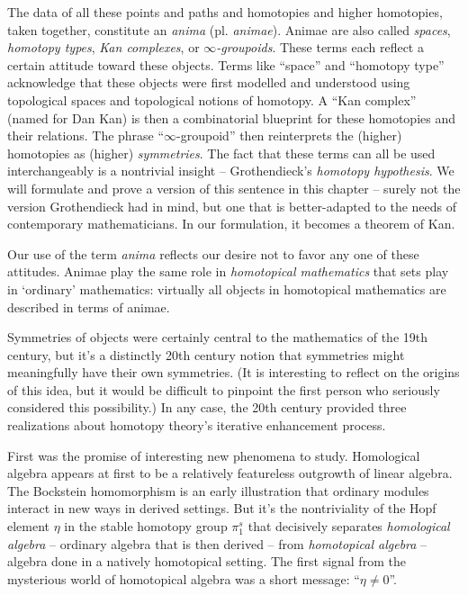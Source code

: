 The data of all these points and paths and homotopies and higher homotopies, taken together, constitute an \emph{anima} (pl. \emph{animae}).
Animae are also called \emph{spaces}, \emph{homotopy types}, \emph{Kan complexes}, or \emph{$\infty$-groupoids}.
These terms each reflect a certain attitude toward these objects.
Terms like \enquote{space} and \enquote{homotopy type} acknowledge that these objects were first modelled and understood using topological spaces and topological notions of homotopy.
A \enquote{Kan complex} (named for Dan Kan) is then a combinatorial blueprint for these homotopies and their relations.
The phrase \enquote{$\infty$-groupoid} then reinterprets the (higher) homotopies as (higher) \emph{symmetries}.
The fact that these terms can all be used interchangeably is a nontrivial insight -- Grothendieck's \emph{homotopy hypothesis}.
We will formulate and prove a version of this sentence in this chapter -- surely not the version Grothendieck had in mind,
but one that is better-adapted to the needs of contemporary mathematicians.
In our formulation, it becomes a theorem of Kan.

Our use of the term \emph{anima} reflects our desire not to favor any one of these attitudes.
Animae play the same role in \emph{homotopical mathematics} that sets play in `ordinary' mathematics:
virtually all objects in homotopical mathematics are described in terms of animae.

Symmetries of objects were certainly central to the mathematics of the 19th century, but
it's a distinctly 20th century notion that symmetries might meaningfully have their own symmetries.
(It is interesting to reflect on the origins of this idea, but
it would be difficult to pinpoint the first person who seriously considered this possibility.)
In any case, the 20th century provided three realizations about homotopy theory's iterative enhancement process.

First was the promise of interesting new phenomena to study.
Homological algebra appears at first to be a relatively featureless outgrowth of linear algebra.
The Bockstein homomorphism is an early illustration that ordinary modules interact in new ways in derived settings.
But it's the nontriviality of the Hopf element $\eta$ in the stable homotopy group $\pi^s_1$ that decisively separates \emph{homological algebra} -- ordinary algebra that is then derived -- from \emph{homotopical algebra} -- algebra done in a natively homotopical setting.
The first signal from the mysterious world of homotopical algebra was a short message: \enquote{$\eta \neq 0$}.

